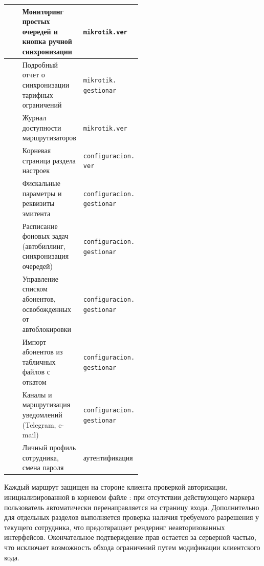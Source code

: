 \begin{xltabular}{\textwidth}{|>{\centering\arraybackslash}m{0.32\linewidth}|X|>{\centering\arraybackslash}m{0.20\linewidth}|}
 & Мониторинг простых очередей и кнопка ручной синхронизации & \texttt{mikrotik.ver} \\ \hline
{} & Подробный отчет о синхронизации тарифных ограничений & \texttt{mikrotik.\newline gestionar} \\ \hline
{} & Журнал доступности маршрутизаторов & \texttt{mikrotik.ver} \\ \hline
{} & Корневая страница раздела настроек & \texttt{configuracion.\newline ver} \\ \hline
{} & Фискальные параметры и реквизиты эмитента & \texttt{configuracion.\newline gestionar} \\ \hline
{} & Расписание фоновых задач (автобиллинг, синхронизация очередей) & \texttt{configuracion.\newline gestionar} \\ \hline
{} & Управление списком абонентов, освобожденных от автоблокировки & \texttt{configuracion.\newline gestionar} \\ \hline
{} & Импорт абонентов из табличных файлов с откатом & \texttt{configuracion.\newline gestionar} \\ \hline
{} & Каналы и маршрутизация уведомлений (Telegram, e-mail) & \texttt{configuracion.\newline gestionar} \\ \hline
{} & Личный профиль сотрудника, смена пароля & аутенти\-фикация \\ \hline
\end{xltabular}

Каждый маршрут защищен на стороне клиента проверкой авторизации, инициализированной в корневом файле : при отсутствии действующего маркера пользователь автоматически перенаправляется на страницу входа. Дополнительно для отдельных разделов выполняется проверка наличия требуемого разрешения у текущего сотрудника, что предотвращает рендеринг неавторизованных интерфейсов. Окончательное подтверждение прав остается за серверной частью, что исключает возможность обхода ограничений путем модификации клиентского кода.

